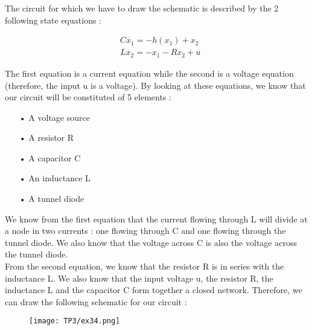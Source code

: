 The circuit for which we have to draw the schematic is described by the 2 following state equations :

\begin{equation}
\begin{split}
&C\dot{x_1} = -h(x_1)+x_2\\
&L\dot{x_2} = -x_1 - Rx_2 + u
\end{split} 
\end{equation}

The first equation is a current equation while the second is a voltage equation (therefore, the input u is a voltage). By looking at these equations, we know that our circuit will be constituted of 5 elements :\\

\begin{itemize}
\item[•] A voltage source
\item[•] A resistor R
\item[•] A capacitor C
\item[•] An inductance L
\item[•] A tunnel diode\\
\end{itemize}

We know from the first equation that the current flowing through L will divide at a node in two currents : one flowing through C and one flowing through the tunnel diode. We also know that the voltage across C is also the voltage across the tunnel diode.\\

From the second equation, we know that the resistor R is in series with the inductance L. We also know that the input voltage u, the resistor R, the inductance L and the capacitor C form together a closed network. Therefore, we can draw the following schematic for our circuit :

\begin{figure}[htbp]
\begin{center}
\texttt{[image: TP3/ex34.png]}
\end{center}
\end{figure}